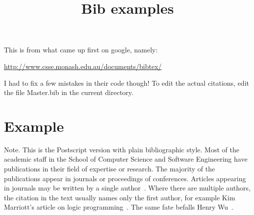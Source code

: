 \documentclass{article}
\title{Bib examples}
\begin{document}


\maketitle

This is from what came up first on google, namely:
\begin{center}
  \url{http://www.csse.monash.edu.au/documents/bibtex/}
\end{center}
I had to fix a few mistakes in their code though!
To edit the actual citations, edit the file Master.bib in the current directory.

\section{Example}
Note. This is the Postscript version with plain bibliographic style.
Most of the academic staff in the School of Computer Science and Software Engineering have publications in their field of expertise or research. The majority of the publications appear in journals or proceedings of conferences. Articles appearing in journals may be written by a single author~\cite{Meyer2000}. Where there are multiple authors, the citation in the text usually names only the first author, for example Kim Marriott's article on logic programming~\cite{Codishetal2000}. The same fate befalls Henry Wu~\cite{Huetal2000}.
%

\end{document}
